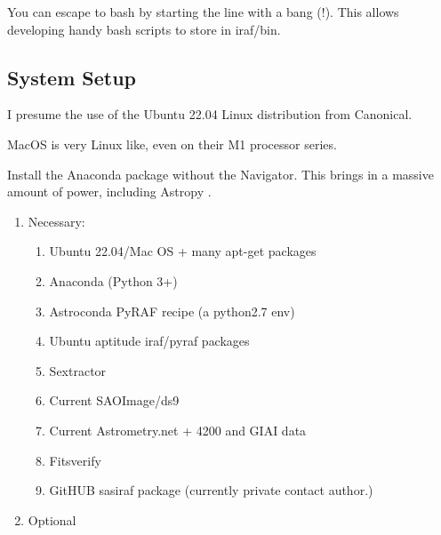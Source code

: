 You can escape to bash by starting the line with a bang (!). This
allows developing handy bash scripts to store in iraf/bin.

\clearpage

\subsection{System Setup}

I presume the use of the Ubuntu 22.04 Linux distribution from Canonical\texttrademark.


MacOS is very Linux like, even on their M1 processor series.

Install the Anaconda package without the Navigator. This brings in
a massive amount of power, including Astropy \cite{astropy:2013} \cite{astropy:2018}
\cite{astropy:2022}.
\vspace{-.15cm}
\begin{enumerate}\addtolength{\itemsep}{-0.5\baselineskip}
   \item    Necessary:
\vspace{-.15cm}
\begin{enumerate}\addtolength{\itemsep}{-0.5\baselineskip}
   \item    Ubuntu 22.04/Mac OS + many apt-get packages
   \item    Anaconda (Python 3+)
   \item    Astroconda PyRAF recipe (a python2.7 env)
   \item    Ubuntu aptitude iraf/pyraf packages
   \item    Sextractor
   \item    Current SAOImage/ds9
   \item    Current Astrometry.net + 4200 and GIAI data
   \item    Fitsverify \cite{fitsverify-1}
   \item    GitHUB sasiraf package (currently private contact author.)
\end{enumerate}
   \item    Optional
\end{enumerate}

